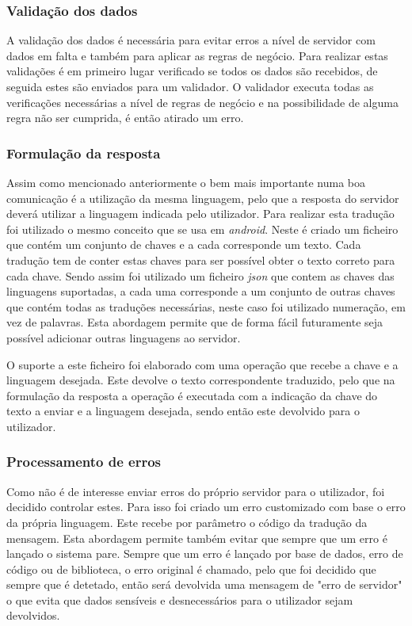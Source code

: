 \subsubsection{Validação dos dados}
A validação dos dados é necessária para evitar erros a nível de servidor com dados em falta e também para aplicar as regras de negócio. Para realizar estas validações é em primeiro lugar verificado se todos os dados são recebidos, de seguida estes são enviados para um validador. O validador executa todas as verificações necessárias a nível de regras de negócio e na possibilidade de alguma regra não ser cumprida, é então atirado um erro.

\subsubsection{Formulação da resposta}
Assim como mencionado anteriormente o bem mais importante numa boa comunicação é a utilização da mesma linguagem, pelo que a resposta do servidor deverá  utilizar a linguagem indicada pelo utilizador. Para realizar esta tradução foi utilizado o mesmo conceito que se usa em \textit{android}. Neste é criado um ficheiro que contém um conjunto de chaves e a cada corresponde um texto. Cada tradução tem de conter estas chaves para ser possível obter o texto correto para cada chave. Sendo assim foi utilizado um ficheiro \textit{json} que contem as chaves das linguagens suportadas, a cada uma corresponde a um conjunto de outras chaves que contém todas as traduções necessárias, neste caso foi utilizado numeração, em vez de palavras. Esta abordagem permite que de forma fácil futuramente seja possível adicionar outras linguagens ao servidor.


O suporte a este ficheiro foi elaborado com uma operação que recebe a chave e a linguagem desejada. Este devolve o texto correspondente traduzido, pelo que na formulação da resposta a operação é executada com a indicação da chave do texto a enviar e a linguagem desejada, sendo então este devolvido para o utilizador.

\newpage

\subsubsection{Processamento de erros}
Como não é de interesse enviar erros do próprio servidor para o utilizador, foi decidido controlar estes. Para isso foi criado um erro customizado com base o erro da própria linguagem. Este recebe por parâmetro o código da tradução da mensagem. Esta abordagem permite também evitar que sempre que um erro é lançado o sistema pare. Sempre que um erro é lançado por base de dados, erro de código ou de biblioteca, o erro original é chamado, pelo que foi decidido que sempre que é detetado, então será devolvida uma mensagem de "erro de servidor" o que evita que dados sensíveis e desnecessários para o utilizador sejam devolvidos.